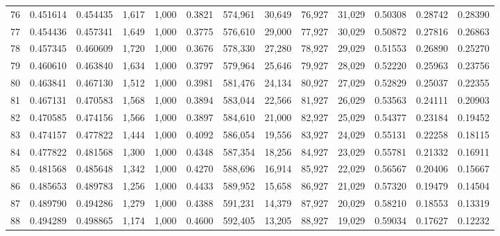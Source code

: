 \begin{tabular}{rrrrrrrrrrrrr}
76  &  0.451614 &  0.454435 &   1,617 &  1,000 &                                     0.3821 &  574,961 &   30,649 &   76,927 &   31,029 &  0.50308 &  0.28742 &  0.28390 \\
77  &  0.454436 &  0.457341 &   1,649 &  1,000 &                                     0.3775 &  576,610 &   29,000 &   77,927 &   30,029 &  0.50872 &  0.27816 &  0.26863 \\
78  &  0.457345 &  0.460609 &   1,720 &  1,000 &                                     0.3676 &  578,330 &   27,280 &   78,927 &   29,029 &  0.51553 &  0.26890 &  0.25270 \\
79  &  0.460610 &  0.463840 &   1,634 &  1,000 &                                     0.3797 &  579,964 &   25,646 &   79,927 &   28,029 &  0.52220 &  0.25963 &  0.23756 \\
80  &  0.463841 &  0.467130 &   1,512 &  1,000 &                                     0.3981 &  581,476 &   24,134 &   80,927 &   27,029 &  0.52829 &  0.25037 &  0.22355 \\
81  &  0.467131 &  0.470583 &   1,568 &  1,000 &                                     0.3894 &  583,044 &   22,566 &   81,927 &   26,029 &  0.53563 &  0.24111 &  0.20903 \\
82  &  0.470585 &  0.474156 &   1,566 &  1,000 &                                     0.3897 &  584,610 &   21,000 &   82,927 &   25,029 &  0.54377 &  0.23184 &  0.19452 \\
83  &  0.474157 &  0.477822 &   1,444 &  1,000 &                                     0.4092 &  586,054 &   19,556 &   83,927 &   24,029 &  0.55131 &  0.22258 &  0.18115 \\
84  &  0.477822 &  0.481568 &   1,300 &  1,000 &                                     0.4348 &  587,354 &   18,256 &   84,927 &   23,029 &  0.55781 &  0.21332 &  0.16911 \\
85  &  0.481568 &  0.485648 &   1,342 &  1,000 &                                     0.4270 &  588,696 &   16,914 &   85,927 &   22,029 &  0.56567 &  0.20406 &  0.15667 \\
86  &  0.485653 &  0.489783 &   1,256 &  1,000 &                                     0.4433 &  589,952 &   15,658 &   86,927 &   21,029 &  0.57320 &  0.19479 &  0.14504 \\
87  &  0.489790 &  0.494286 &   1,279 &  1,000 &                                     0.4388 &  591,231 &   14,379 &   87,927 &   20,029 &  0.58210 &  0.18553 &  0.13319 \\
88  &  0.494289 &  0.498865 &   1,174 &  1,000 &                                     0.4600 &  592,405 &   13,205 &   88,927 &   19,029 &  0.59034 &  0.17627 &  0.12232 \\

\end{tabular}
